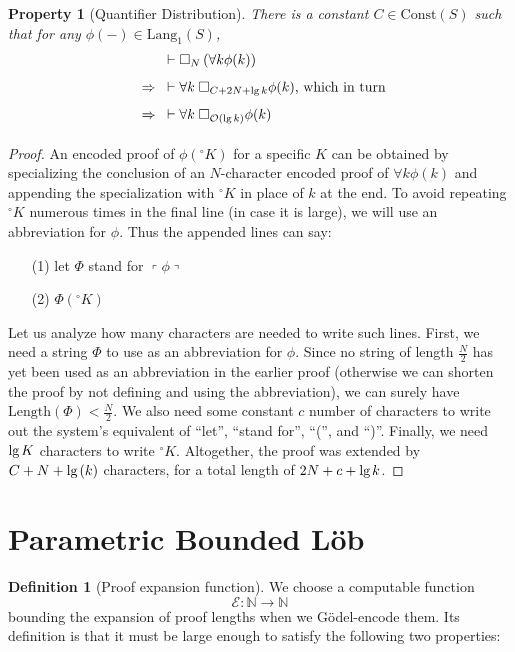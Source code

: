 \documentclass[onecolumn]{miri-tech-article}
\newtheorem{property}{Property}
\numberwithin{equation}{section}
\theoremstyle{definition}
\newtheorem{definition}[theorem]{Definition}
\newcommand{\NN}{\mathbb{N}}
\newcommand{\Ee}{\mathcal{E}}
\newcommand{\Oo}{\mathcal{O}}
\newcommand{\proves}[1]{\underset{#1}{\vdash}}
\newcommand{\bx}[1]{\Box_{#1}}
\newcommand{\Lang}{\mathrm{Lang}}
\newcommand{\Const}{\mathrm{Const}}
\renewcommand{\to}{\rightarrow}
\newcommand{\Implies}{\;\;\Rightarrow\;\;}
\newcommand{\qquote}[1]{\left\ulcorner #1 \right\urcorner}
\newcommand{\numeral}{{}^\circ}
\renewcommand{\lg}{\mathrm{lg\hspace{0.3ex}}}
\renewcommand{\-}{^{-1}}
\begin{document}
\begin{property}[Quantifier Distribution]
There is a constant $C\in \Const(S)$ such that for any $\phi(-) \in \Lang_1(S)$,
\begin{align*}
             &\proves{}\bx{N}\left(\forall k \phi(k)\right)\\
\Implies &\proves{} \forall k \; \bx{C+2N+\lg k} \phi(k)\text{, which in turn}\\
\Implies &\proves{} \forall k \; \bx{\Oo(\lg k)} \phi(k)
\end{align*}
\end{property}

\begin{proof}
An encoded proof of $\phi(\numeral K)$ for a specific $K$ can be obtained by specializing the conclusion of an $N$-character encoded proof of $\forall k \phi(k)$ and appending the specialization with $\numeral K$ in place of $k$ at the end.  To avoid repeating $\numeral K$ numerous times in the final line (in case it is large), we will use an abbreviation for $\phi$.  Thus the appended lines can say:
\begin{itemize}
\item[(1)] let $\Phi$ stand for $\qquote{\phi}$
\item[(2)] $\Phi(\numeral K)$
\end{itemize}
Let us analyze how many characters are needed to write such lines.  First, we need a string $\Phi$ to use as an abbreviation for $\phi$.  Since no string of length $\frac{N}{2}$ has yet been used as an abbreviation in the earlier proof (otherwise we can shorten the proof by not defining and using the abbreviation), we can surely have $\mathrm{Length}(\Phi)<\frac{N}{2}$.  We also need some constant $c$ number of characters to write out the system's equivalent of ``let'', ``stand for'', ``('', and ``)''.  Finally, we need $\lg K$ characters to write $\numeral K$.  Altogether, the proof was extended by $C+N+\lg(k)$ characters, for a total length of $2N+c+\lg k$.  
\end{proof}

\section{Parametric Bounded L\"{o}b}\label{sec:blob}

\begin{definition}[Proof expansion function]\label{def:E}We choose a computable function $$\Ee:\NN\to\NN$$ bounding the expansion of proof lengths when we G\"{o}del-encode them.  Its definition is that it must be large enough to satisfy the following two properties:
\end{definition}
\end{document}
